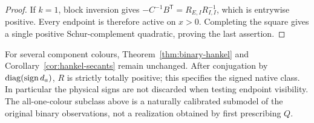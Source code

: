 \begin{proof}
If $k=1$, block inversion gives
$-C^{-1}B^{\mathsf T}=R_{E,I}R_{I,I}^{-1}$, which is entrywise positive.
Every endpoint is therefore active on $x>0$. Completing the square gives
a single positive Schur-complement quadratic, proving the last assertion.
\end{proof}

For several component colours, Theorem~\ref{thm:binary-hankel} and
Corollary~\ref{cor:hankel-secants} remain unchanged. After conjugation by
$\operatorname{diag}(\operatorname{sign}d_a)$, $R$ is strictly totally positive; this
specifies the signed native class. In particular the physical signs are
not discarded when testing endpoint visibility. The all-one-colour
subclass above is a naturally calibrated submodel of the original binary
observations, not a realization obtained by first prescribing $Q$.
